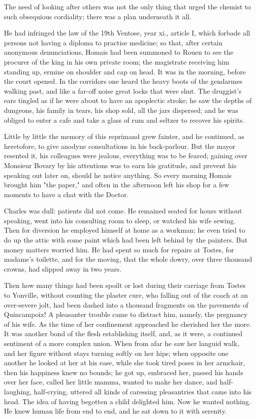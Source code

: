 \documentclass{tufte-book}
\begin{document}
The need of looking after others was not the only thing that urged the
chemist to such obsequious cordiality; there was a plan underneath it
all.

He had infringed the law of the 19th Ventose, year xi., article I, which
forbade all persons not having a diploma to practise medicine; so that,
after certain anonymous denunciations, Homais had been summoned to Rouen
to see the procurer of the king in his own private room; the magistrate
receiving him standing up, ermine on shoulder and cap on head. It was
in the morning, before the court opened. In the corridors one heard
the heavy boots of the gendarmes walking past, and like a far-off noise
great locks that were shut. The druggist's ears tingled as if he were
about to have an apoplectic stroke; he saw the depths of dungeons,
his family in tears, his shop sold, all the jars dispersed; and he was
obliged to enter a cafe and take a glass of rum and seltzer to recover
his spirits.

Little by little the memory of this reprimand grew fainter, and
he continued, as heretofore, to give anodyne consultations in his
back-parlour. But the mayor resented it, his colleagues were jealous,
everything was to be feared; gaining over Monsieur Bovary by his
attentions was to earn his gratitude, and prevent his speaking out later
on, should he notice anything. So every morning Homais brought him "the
paper," and often in the afternoon left his shop for a few moments to
have a chat with the Doctor.

Charles was dull: patients did not come. He remained seated for hours
without speaking, went into his consulting room to sleep, or watched
his wife sewing. Then for diversion he employed himself at home as a
workman; he even tried to do up the attic with some paint which had been
left behind by the painters. But money matters worried him. He had
spent so much for repairs at Tostes, for madame's toilette, and for the
moving, that the whole dowry, over three thousand crowns, had slipped
away in two years.

Then how many things had been spoilt or lost during their carriage from
Tostes to Yonville, without counting the plaster cure, who falling out
of the coach at an over-severe jolt, had been dashed into a thousand
fragments on the pavements of Quincampoix! A pleasanter trouble came
to distract him, namely, the pregnancy of his wife. As the time of her
confinement approached he cherished her the more. It was another bond of
the flesh establishing itself, and, as it were, a continued sentiment
of a more complex union. When from afar he saw her languid walk, and
her figure without stays turning softly on her hips; when opposite one
another he looked at her at his ease, while she took tired poses in her
armchair, then his happiness knew no bounds; he got up, embraced her,
passed his hands over her face, called her little mamma, wanted to
make her dance, and half-laughing, half-crying, uttered all kinds of
caressing pleasantries that came into his head. The idea of having
begotten a child delighted him. Now he wanted nothing. He knew human
life from end to end, and he sat down to it with serenity.
\end{document}

